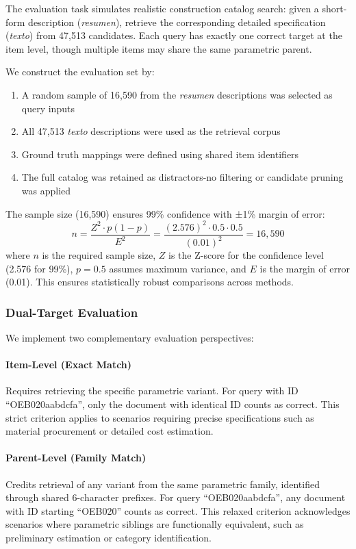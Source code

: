 \documentclass[preprint,12pt]{elsarticle}
\begin{document}
The evaluation task simulates realistic construction catalog search: given a short-form description (\textit{resumen}), retrieve the corresponding detailed specification (\textit{texto}) from 47,513 candidates. Each query has exactly one correct target at the item level, though multiple items may share the same parametric parent.

We construct the evaluation set by:
\begin{enumerate}
    \item A random sample of 16,590 from the \textit{resumen} descriptions was selected as query inputs
    \item All 47,513 \textit{texto} descriptions were used as the retrieval corpus
    \item Ground truth mappings were defined using shared item identifiers
    \item The full catalog was retained as distractors-no filtering or candidate pruning was applied
\end{enumerate}

The sample size (16,590) ensures 99\% confidence with ±1\% margin of error:
\[
n = \frac{Z^2 \cdot p(1 - p)}{E^2} = \frac{(2.576)^2 \cdot 0.5 \cdot 0.5}{(0.01)^2} = 16{,}590
\]
where $n$ is the required sample size, $Z$ is the Z-score for the confidence level (2.576 for 99\%), $p = 0.5$ assumes maximum variance, and $E$ is the margin of error (0.01). This ensures statistically robust comparisons across methods.

\subsubsection{Dual-Target Evaluation}

We implement two complementary evaluation perspectives:

\paragraph{Item-Level (Exact Match)}
Requires retrieving the specific parametric variant. For query with ID ``OEB020aabdcfa'', only the document with identical ID counts as correct. This strict criterion applies to scenarios requiring precise specifications such as material procurement or detailed cost estimation.

\paragraph{Parent-Level (Family Match)}
Credits retrieval of any variant from the same parametric family, identified through shared 6-character prefixes. For query ``OEB020aabdcfa'', any document with ID starting ``OEB020'' counts as correct. This relaxed criterion acknowledges scenarios where parametric siblings are functionally equivalent, such as preliminary estimation or category identification.
\end{document}
